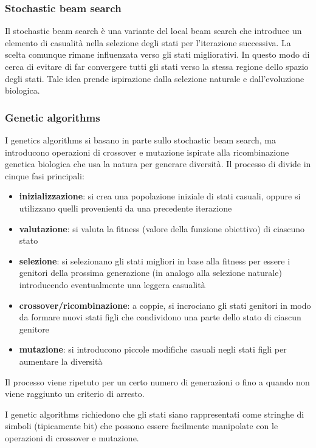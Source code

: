 \subsubsection*{Stochastic beam search}
Il stochastic beam search è una variante del local beam search che introduce un elemento di casualità nella selezione degli stati
per l'iterazione successiva. La scelta comunque rimane influenzata verso gli stati migliorativi. In questo modo di cerca di
evitare di far convergere tutti gli stati verso la stessa regione dello spazio degli stati. Tale idea prende ispirazione dalla
selezione naturale e dall'evoluzione biologica.

\subsubsection*{Genetic algorithms}
I genetics algorithms si basano in parte sullo stochastic beam search, ma introducono operazioni di crossover e mutazione ispirate
alla ricombinazione genetica biologica che usa la natura per generare diversità. Il processo di divide in cinque fasi principali:
\begin{itemize}
	\item \textbf{inizializzazione}: si crea una popolazione iniziale di stati casuali, oppure si utilizzano quelli provenienti
	da una precedente iterazione
	\item \textbf{valutazione}: si valuta la fitness (valore della funzione obiettivo) di ciascuno stato
	\item \textbf{selezione}: si selezionano gli stati migliori in base alla fitness per essere i genitori della prossima
	generazione (in analogo alla selezione naturale) introducendo eventualmente una leggera casualità
	\item \textbf{crossover/ricombinazione}: a coppie, si incrociano gli stati genitori in modo da formare nuovi stati figli
	che condividono una parte dello stato di ciascun genitore
	\item \textbf{mutazione}: si introducono piccole modifiche casuali negli stati figli per aumentare la diversità
\end{itemize}
Il processo viene ripetuto per un certo numero di generazioni o fino a quando non viene raggiunto un criterio di arresto.

I genetic algorithms richiedono che gli stati siano rappresentati come stringhe di simboli (tipicamente bit) che possono essere
facilmente manipolate con le operazioni di crossover e mutazione.
